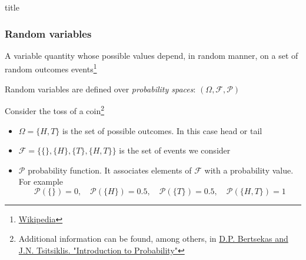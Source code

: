 \begin{frame}
	\vfill
	\centering
	\begin{beamercolorbox}[sep=8pt,center,shadow=true,rounded=true]{title}
		\insertsectionhead\par%
	\end{beamercolorbox}
	\vfill
\end{frame}

\begin{frame}
	\frametitle{Random variables}
	A variable quantity whose possible values depend, in random manner, on a set of random outcomes events\footnote{\href{https://en.wikipedia.org/wiki/Random_variable}{Wikipedia}}\vspace{1em}
	
	Random variables are defined over \emph{probability spaces}: $(\Omega, \mathcal{F}, \mathcal{P})$\vspace{1em}
	
	Consider the toss of a coin\footnote{Additional information can be found, among others, in \href{http://vfu.bg/en/e-Learning/Math--Bertsekas_Tsitsiklis_Introduction_to_probability.pdf}{D.P. Bertsekas and J.N. Tsitsiklis. "Introduction to Probability"}}
	\begin{itemize}
		\item $\Omega=\{H, T\}$ is the set of possible outcomes. In this case head or tail
		\item $\mathcal{F}=\{\{\}, \{H\}, \{T\}, \{H,T\}\}$ is the set of events we consider
		\item $\mathcal{P}$ probability function. It associates elements of $\mathcal{F}$ with a probability value. For example $$\mathcal{P}(\{\})=0,\quad\mathcal{P}(\{H\})=0.5, \quad\mathcal{P}(\{T\})=0.5, \quad \mathcal{P}(\{H, T\})=1$$
	\end{itemize}
\end{frame}

